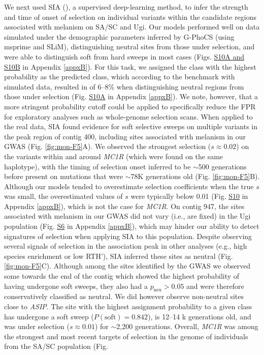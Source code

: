 We next used \ac{SIA} (\cite{hejase_deep-learning_2022}), a supervised deep-learning method, to infer the strength and time of onset of selection on individual variants within the candidate regions associated with melanism on \ac{SA/SC} and Ugi. Our models performed well on data simulated under the demographic parameters inferred by G-PhoCS (using msprime and SLiM), distinguishing neutral sites from those under selection, and were able to distinguish soft from hard sweeps in most cases (Figs. \href{https://journals.plos.org/PLOSGENETICS/article?id=10.1371/journal.pgen.1010474#sec017}{S10A and S10B} in Appendix \ref{appxB}). For this task, we assigned the class with the highest probability as the predicted class, which according to the benchmark with simulated data, resulted in  of 6–8\% when distinguishing neutral regions from those under selection (Fig. \href{https://journals.plos.org/PLOSGENETICS/article?id=10.1371/journal.pgen.1010474#sec017}{S10A} in Appendix \ref{appxB}). We note, however, that a more stringent probability cutoff could be applied to specifically reduce the \ac{FPR} for exploratory analyses such as whole-genome selection scans. When applied to the real data, \ac{SIA} found evidence for soft selective sweeps on multiple variants in the peak region of contig 400, including sites associated with melanism in our \ac{GWAS} (Fig. \ref{fig:mon-F5}A). We observed the strongest selection ($s \approx 0.02$) on the variants within and around \textit{MC1R} (which were found on the same haplotype), with the timing of selection onset inferred to be $\sim$500 generations before present on mutations that were $\sim$78K generations old (Fig. \ref{fig:mon-F5}B). Although our models tended to overestimate selection coefficients when the true $s$ was small, the overestimated values of $s$ were typically below 0.01 (Fig. \href{https://journals.plos.org/PLOSGENETICS/article?id=10.1371/journal.pgen.1010474#sec017}{S10} in Appendix \ref{appxB}), which is not the case for \textit{MC1R}. On contig 947, the sites associated with melanism in our \ac{GWAS} did not vary (i.e., are fixed) in the Ugi population (Fig. \href{https://journals.plos.org/PLOSGENETICS/article?id=10.1371/journal.pgen.1010474#sec017}{S6} in Appendix \ref{appxB}), which may hinder our ability to detect signatures of selection when applying \ac{SIA} to this population. Despite observing several signals of selection in the association peak in other analyses (e.g., high species enrichment or low \acs{RTH}’), \ac{SIA} inferred these sites as neutral (Fig. \ref{fig:mon-F5}C). Although among the sites identified by the \ac{GWAS} we observed some towards the end of the contig which showed the highest probability of having undergone soft sweeps, they also had a $p_{\mathrm{neu}} > 0.05$ and were therefore conservatively classified as neutral. We did however observe non-neutral sites close to \textit{ASIP}. The site with the highest assignment probability to a given class has undergone a soft sweep ($P\mathrm{(soft)} = 0.842$), is 12–14 k generations old, and was under selection ($s \approx 0.01$) for $\sim$2,200 generations. Overall, \textit{MC1R} was among the strongest and most recent targets of selection in the genome of individuals from the \ac{SA/SC} population (Fig. 